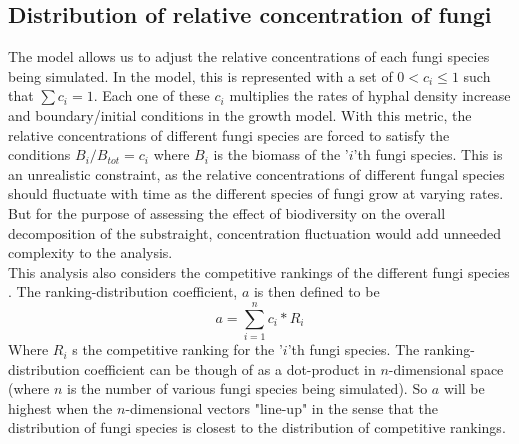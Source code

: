 \documentclass[12pt]{article}
\begin{document}
\begin{multicols}{2}
\subsection*{Distribution of relative concentration of fungi}
The model allows us to adjust the relative concentrations of each fungi species being simulated. In the model, this is represented with a set of $0<c_{i}\leq 1$ such that $\sum c_{i} = 1$. Each one of these $c_{i}$ multiplies the rates of hyphal density increase and boundary/initial conditions in the growth model. With this metric, the relative concentrations of different fungi species are forced to satisfy the conditions $B_{i}/B_{tot}=c_{i}$ where $B_{i}$ is the biomass of the '$i$'th fungi species. This is an unrealistic constraint, as the relative concentrations of different fungal species should fluctuate with time as the different species of fungi grow at varying rates. But for the purpose of assessing the effect of biodiversity on the overall decomposition of the substraight, concentration fluctuation would add unneeded complexity to the analysis. \\
This analysis also considers the competitive rankings of the different fungi species \cite{Maynard2019}. The ranking-distribution coefficient, $a$ is then defined to be
\begin{equation} \label{eq}
a = \sum_{i=1}^{n} c_{i}*R_{i}
\end{equation}
Where $R_{i}$ s the competitive ranking for the '$i$'th fungi species. The ranking-distribution coefficient can be though of as a dot-product in $n$-dimensional space (where $n$ is the number of various fungi species being simulated). So $a$ will be highest when the $n$-dimensional vectors "line-up" in the sense that the distribution of fungi species is closest to the distribution of competitive rankings.\\

\end{multicols}
\end{document}
